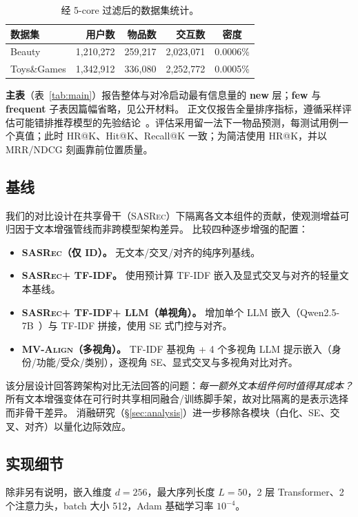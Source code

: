 \documentclass[sigconf,natbib=true,anonymous]{acmart}
\newcommand{\model}{\textsc{MV-Align}\xspace}
\newcommand{\base}{\textsc{SASRec}\xspace}
\newcommand{\tfidf}{\textsc{TF-IDF}\xspace}
\newcommand{\llm}{\textsc{LLM}\xspace}
\begin{document}
\begin{table}[h]
\caption{经 5-core 过滤后的数据集统计。}
\label{tab:dataset}
\centering
\small
\begin{tabular}{lrrrc}
\toprule
\textbf{数据集} & \textbf{用户数} & \textbf{物品数} & \textbf{交互数} & \textbf{密度} \\
\midrule
Beauty      & 1,210,272 & 259,217 & 2,023,071 & 0.0006\% \\
Toys\&Games & 1,342,912 & 336,080 & 2,252,772 & 0.0005\% \\
\bottomrule
\end{tabular}
\end{table}

\textbf{主表}（表~\ref{tab:main}）报告整体与对冷启动最有信息量的 \textbf{new} 层；\textbf{few} 与 \textbf{frequent} 子表因篇幅省略，见公开材料。
正文仅报告全量排序指标，遵循采样评估可能错排推荐模型的先验结论~\cite{krichene2020sampledmetrics}。评估采用留一法下一物品预测，每测试用例一个真值；此时 HR@K、Hit@K、Recall@K 一致；为简洁使用 HR@K，并以 MRR/NDCG 刻画靠前位置质量。

\subsection{基线}
我们的对比设计在共享骨干（\base）下隔离各文本组件的贡献，使观测增益可归因于文本增强管线而非跨模型架构差异。
比较四种逐步增强的配置：
\begin{itemize}[leftmargin=*,itemsep=2pt]
  \item \textbf{\base（仅 ID）。} 无文本/交叉/对齐的纯序列基线。
  \item \textbf{\base + \tfidf。} 使用预计算 \tfidf 嵌入及显式交叉与对齐的轻量文本基线。
  \item \textbf{\base + \tfidf + \llm（单视角）。} 增加单个 \llm 嵌入（Qwen2.5-7B~\cite{qwen2024qwen25}）与 \tfidf 拼接，使用 SE 式门控与对齐。
  \item \textbf{\model（多视角）。} \tfidf 基视角 + 4 个多视角 \llm 提示嵌入（身份/功能/受众/类别），逐视角 SE、显式交叉与多视角对比对齐。
\end{itemize}
\noindent 该分层设计回答跨架构对比无法回答的问题：\emph{每一额外文本组件何时值得其成本？}
所有文本增强变体在可行时共享相同融合/训练脚手架，故对比隔离的是表示选择而非骨干差异。
消融研究（\S\ref{sec:analysis}）进一步移除各模块（白化、SE、交叉、对齐）以量化边际效应。

\subsection{实现细节}
除非另有说明，嵌入维度 $d=256$，最大序列长度 $L=50$，2 层 Transformer、2 个注意力头，batch 大小 512，Adam 基础学习率 $10^{-4}$。
\end{document}
